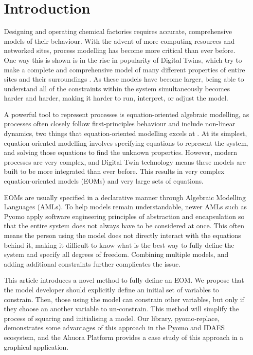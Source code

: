 \hypertarget{introduction}{%
\section{Introduction}\label{introduction}}

Designing and operating chemical factories requires accurate,
comprehensive models of their behaviour. With the advent of more
computing resources and networked sites, process modelling has become
more critical than ever before. One way this is shown is in the rise in
popularity of Digital Twins, which try to make a complete and
comprehensive model of many different properties of entire sites and
their surroundings \citep{walmsley2024adaptive}. As these models have
become larger, being able to understand all of the constraints within
the system simultaneously becomes harder and harder, making it harder to
run, interpret, or adjust the model.

A powerful tool to represent processes is equation-oriented algebraic
modelling, as processes often closely follow first-principles behaviour
and include non-linear dynamics, two things that equation-oriented
modelling excels at \citep{shacham1982equation}. At its simplest,
equation-oriented modelling involves specifying equations to represent
the system, and solving those equations to find the unknown properties.
However, modern processes are very complex, and Digital Twin technology
means these models are built to be more integrated than ever before.
This results in very complex equation-oriented models (EOMs) and very
large sets of equations.

EOMs are usually specified in a declarative manner through Algebraic
Modelling Languages (AMLs). To help models remain understandable, newer
AMLs such as Pyomo apply software engineering principles of abstraction
and encapsulation so that the entire system does not always have to be
considered at once. This often means the person using the model does not
directly interact with the equations behind it, making it difficult to
know what is the best way to fully define the system and specify all
degrees of freedom. Combining multiple models, and adding additional
constraints further complicates the issue.

This article introduces a novel method to fully define an EOM. We
propose that the model developer should explicitly define an initial set
of variables to constrain. Then, those using the model can constrain
other variables, but only if they choose an another variable to
un-constrain. This method will simplify the process of squaring and
initialising a model. Our library, pyomo-replace, demonstrates some
advantages of this approach in the Pyomo and IDAES
\citep{miller2018next} ecosystem, and the Ahuora Platform provides a
case study of this approach in a graphical application.

